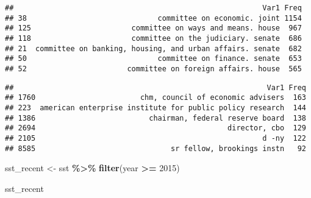 \documentclass[]{article}
\newenvironment{Shaded}{\begin{snugshade}}{\end{snugshade}}
\newcommand{\CommentTok}[1]{\textcolor[rgb]{0.56,0.35,0.01}{\textit{#1}}}
\newcommand{\DecValTok}[1]{\textcolor[rgb]{0.00,0.00,0.81}{#1}}
\newcommand{\KeywordTok}[1]{\textcolor[rgb]{0.13,0.29,0.53}{\textbf{#1}}}
\newcommand{\NormalTok}[1]{#1}
\newcommand{\OperatorTok}[1]{\textcolor[rgb]{0.81,0.36,0.00}{\textbf{#1}}}
\newcommand{\StringTok}[1]{\textcolor[rgb]{0.31,0.60,0.02}{#1}}
\begin{document}
\begin{verbatim}
##                                                         Var1 Freq
## 38                              committee on economic. joint 1154
## 125                       committee on ways and means. house  967
## 118                       committee on the judiciary. senate  686
## 21  committee on banking, housing, and urban affairs. senate  682
## 50                              committee on finance. senate  653
## 52                       committee on foreign affairs. house  565
\end{verbatim}

\begin{Shaded}
\end{Shaded}

\begin{verbatim}
##                                                          Var1 Freq
## 1760                        chm, council of economic advisers  163
## 223  american enterprise institute for public policy research  144
## 1386                          chairman, federal reserve board  138
## 2694                                            director, cbo  129
## 2105                                                    d -ny  122
## 8585                               sr fellow, brookings instn   92
\end{verbatim}

\begin{Shaded}
\begin{Highlighting}[]
\NormalTok{sst\_recent \textless{}{-}}\StringTok{ }\NormalTok{sst }\OperatorTok{\%\textgreater{}\%}
\StringTok{  }\KeywordTok{filter}\NormalTok{(year }\OperatorTok{\textgreater{}=}\StringTok{ }\DecValTok{2015}\NormalTok{)}

\NormalTok{sst\_recent}
\end{Highlighting}
\end{Shaded}
\end{document}
